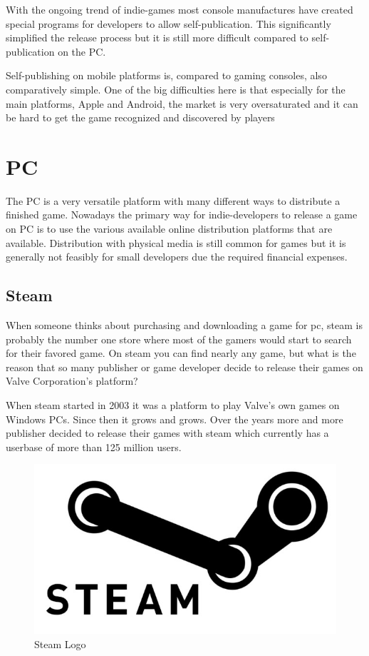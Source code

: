 With the ongoing trend of indie-games most console manufactures have created special programs for developers to allow self-publication. This significantly simplified the release process but it is still more difficult compared to self-publication on the PC. 

Self-publishing on mobile platforms is, compared to gaming consoles, also comparatively simple. One of the big difficulties here is that especially for the main platforms, Apple and Android, the market is very oversaturated and it can be hard to get the game recognized and discovered by players


\section{PC}
\label{sec:pc}
The PC is a very versatile platform with many different ways to distribute a finished game. Nowadays the primary way for indie-developers to release a game on PC is to use the various available online distribution platforms that are available. Distribution with physical media is still common for games but it is generally not feasibly for small developers due the required financial expenses.

\subsection{Steam}
\label{subsec:steam}
When someone thinks about purchasing and downloading a game for pc, steam is probably the number one store where most of the gamers would start to search for their favored game. On steam you can find nearly any game, but what is the reason that so many publisher or game developer decide to release their games on Valve Corporation's platform?

When steam started in 2003 it was a platform to play Valve's own games on Windows PCs. Since then it grows and grows. Over the years more and more publisher decided to release their games with steam which currently has a userbase of more than 125 million users.

\begin{figure}[!hbp]
\includegraphics[width=\linewidth]{img/steam.jpg}
\centering
\caption{ Steam Logo }
\label{fig:steam}
\end{figure}

